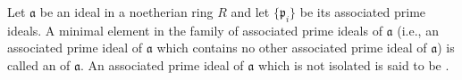 Let $\mathfrak{a}$ be an ideal in a noetherian ring $R$ and let $\{\mathfrak{p}_i\}$ be its associated prime ideals. A minimal element in the family of associated prime ideals of $\mathfrak{a}$ (i.e., an associated prime ideal of $\mathfrak{a}$ which contains no other associated prime ideal of $\mathfrak{a}$) is called an  of $\mathfrak{a}$. An associated prime ideal of $\mathfrak{a}$ which is not isolated is said to be .
